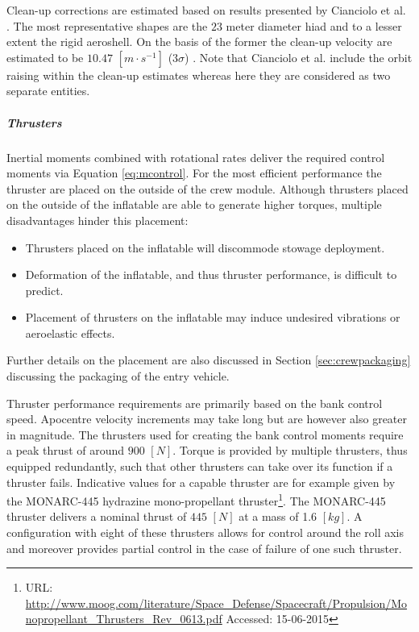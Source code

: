 Clean-up corrections are estimated based on results presented by Cianciolo et al. \cite{Cianciolo2010}. The most representative shapes are the $23$ meter diameter \gls{hiad} and to a lesser extent the rigid aeroshell. On the basis of the former the clean-up velocity are estimated to be $10.47$ $[m\cdot s^{-1}]$ ($3\sigma$) \cite[p.37]{Cianciolo2010}. Note that Cianciolo et al. include the orbit raising within the clean-up estimates whereas here they are considered as two separate entities.

\subparagraph{Thrusters}
Inertial moments combined with rotational rates deliver the required control moments via Equation \ref{eq:mcontrol}. For the most efficient performance the thruster are placed on the outside of the crew module. Although thrusters placed on the outside of the inflatable are able to generate higher torques, multiple disadvantages hinder this placement:
\begin{itemize}
\item Thrusters placed on the inflatable will discommode stowage deployment.
\item Deformation of the inflatable, and thus thruster performance, is difficult to predict.
\item Placement of thrusters on the inflatable may induce undesired vibrations or aeroelastic effects.  
\end{itemize} 

Further details on the placement are also discussed in Section \ref{sec:crewpackaging} discussing the packaging of the entry vehicle.

Thruster performance requirements are primarily based on the bank control speed. Apocentre velocity increments may take long but are however also greater in magnitude. The thrusters used for creating the bank control moments require a peak thrust of around $900$ $[N]$. Torque is provided by multiple thrusters, thus equipped redundantly, such that other thrusters can take over its function if a thruster fails.
Indicative values for a capable thruster are for example given by the  MONARC-445 hydrazine mono-propellant thruster\footnote{URL: \url{http://www.moog.com/literature/Space\_Defense/Spacecraft/Propulsion/Monopropellant\_Thrusters\_Rev\_0613.pdf} Accessed: 15-06-2015}. The MONARC-445 thruster delivers a nominal thrust of $445$ $[N]$ at a mass of 1.6 $[kg]$.  A configuration with eight of these thrusters allows for control around the roll axis and moreover provides partial control in the case of failure of one such thruster.
 
